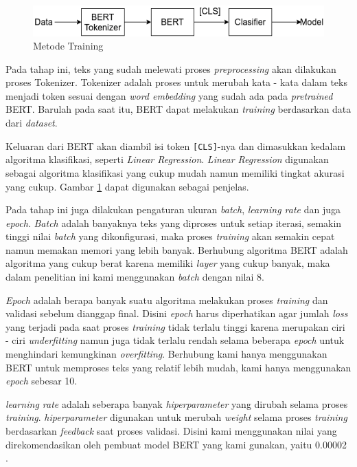 \begin{figure}[h!]
    \begin{center}
        \includegraphics[width= 0.9\linewidth]{gambar/training.png}
        \caption{Metode Training}
        \label{fig: metodologi_training}
    \end{center}
\end{figure}

Pada tahap ini, teks yang sudah melewati proses \textit{preprocessing} akan dilakukan proses Tokenizer. Tokenizer adalah proses untuk merubah kata - kata dalam teks menjadi token sesuai dengan \textit{word embedding} yang sudah ada pada \textit{pretrained} BERT. Barulah pada saat itu, BERT dapat melakukan \textit{training} berdasarkan data dari \textit{dataset}.

Keluaran dari BERT akan diambil isi token \texttt{[CLS]}-nya dan dimasukkan kedalam algoritma klasifikasi, seperti \textit{Linear Regression}. \textit{Linear Regression} digunakan sebagai algoritma klasifikasi yang cukup mudah namun memiliki tingkat akurasi yang cukup. Gambar \ref{fig: metodologi_training} dapat digunakan sebagai penjelas.

Pada tahap ini juga dilakukan pengaturan ukuran \textit{batch}, \textit{learning rate} dan juga \textit{epoch}. \textit{Batch} adalah banyaknya teks yang diproses untuk setiap iterasi, semakin tinggi nilai \textit{batch} yang dikonfigurasi, maka proses \textit{training} akan semakin cepat namun memakan memori yang lebih banyak. Berhubung algoritma BERT adalah algoritma yang cukup berat karena memiliki \textit{layer} yang cukup banyak, maka dalam penelitian ini kami menggunakan \textit{batch} dengan nilai 8.

\textit{Epoch} adalah berapa banyak suatu algoritma melakukan proses \textit{training} dan validasi sebelum dianggap final. Disini \textit{epoch} harus diperhatikan agar jumlah \textit{loss} yang terjadi pada saat proses \textit{training} tidak terlalu tinggi karena merupakan ciri - ciri \textit{underfitting} namun juga tidak terlalu rendah selama beberapa \textit{epoch} untuk menghindari kemungkinan \textit{overfitting}. Berhubung kami hanya menggunakan BERT untuk memproses teks yang relatif lebih mudah, kami hanya menggunakan \textit{epoch} sebesar 10.

\textit{learning rate} adalah seberapa banyak \textit{hiperparameter} yang dirubah selama proses \textit{training}. \textit{hiperparameter} digunakan untuk merubah \textit{weight} selama proses \textit{training} berdasarkan \textit{feedback} saat proses validasi. Disini kami menggunakan nilai yang direkomendasikan oleh pembuat model BERT yang kami gunakan, yaitu 0.00002 \cite{koto2020indolem}.


